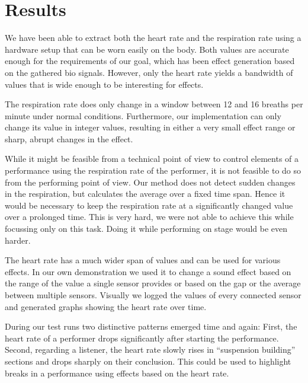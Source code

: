\documentclass{sigchi-ext}
\begin{document}
\section{Results}

We have been able to extract both the heart rate and the respiration rate using a hardware setup that can be
worn easily on the body. Both values are accurate enough for the requirements of our goal, which has been
effect generation based on the gathered bio signals. However, only the heart rate yields a bandwidth of values
that is wide enough to be interesting for effects.

The respiration rate does only change in a window between 12 and 16 breaths per minute under normal conditions.
Furthermore, our implementation can only change its value in integer values, resulting in either a very small
effect range or sharp, abrupt changes in the effect. %

While it might be feasible from a technical point of view to control elements of a performance using the respiration
rate of the performer, it is not feasible to do so from the performing point of view. Our method does not detect
sudden changes in the respiration, but calculates the average over a fixed time span. Hence it would be necessary
to keep the respiration rate at a significantly changed value over a prolonged time. This is very hard, we were
not able to achieve this while focussing only on this task. Doing it while performing on stage would be even harder.

The heart rate has a much wider span of values and can be used for various effects. In our own demonstration we used
it to change a sound effect based on the range of the value a single sensor provides or based on the gap or the average
between multiple sensors. Visually we logged the values of every connected sensor and generated graphs showing the
heart rate over time.

During our test runs two distinctive patterns emerged time and again: First, the heart rate of a performer
drops significantly after starting the performance. Second, regarding a listener, the heart rate slowly rises
in ``suspension building'' sections and drops sharply on their conclusion. This could be used to highlight
breaks in a performance using effects based on the heart rate.

\balance{} 



\end{document}
